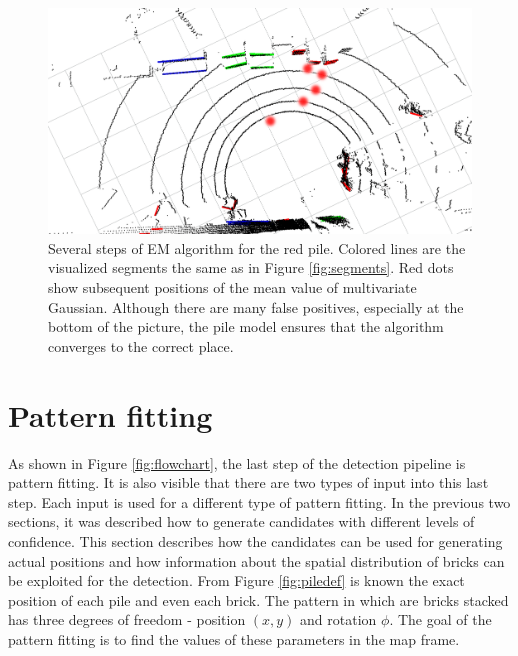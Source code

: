 \begin{figure}[H]
\centering
\includegraphics[scale=0.3]{fig/em_algo.png}
\caption[Em Algorithm in pile detector]{Several steps of EM algorithm for the red pile. Colored lines are the visualized segments the same as in Figure \ref{fig:segments}. Red dots show subsequent positions of the mean value of multivariate Gaussian. Although there are many false positives, especially at the bottom of the picture, the pile model ensures that the algorithm converges to the correct place.}
\label{fig:em}
\end{figure}


\section{Pattern fitting}
As shown in Figure \ref{fig:flowchart}, the last step of the detection pipeline is pattern fitting. It is also visible that there are two types of input into this last step. Each input is used for a different type of pattern fitting. In the previous two sections, it was described how to generate candidates with different levels of confidence. This section describes how the candidates can be used for generating actual positions and how information about the spatial distribution of bricks can be exploited for the detection. From Figure \ref{fig:piledef} is known the exact position of each pile and even each brick. The pattern in which are bricks stacked has three degrees of freedom - position $(x, y)$ and rotation $\phi$. The goal of the pattern fitting is to find the values of these parameters in the map frame.

